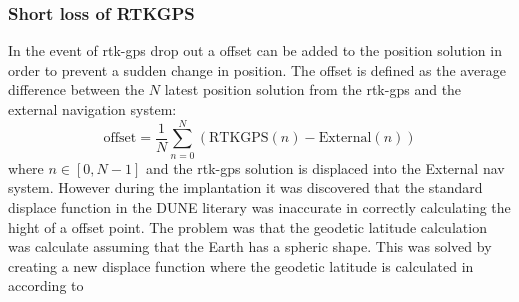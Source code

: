 \subsubsection{Short loss of RTKGPS}\label{ss:ShortLoss}
In the event of \gls{rtk-gps} drop out a offset can be added to the position solution in order to prevent a sudden change in position. The offset is defined as the average difference between the $N$ latest position solution from the \gls{rtk-gps} and the external navigation system:
\begin{equation}
\text{offset} = \frac{1}{N}\sum_{n=0}^N(\text{RTKGPS}(n)-\text{External}(n))
\end{equation}
where $n \in [0,N-1]$ and the \gls{rtk-gps} solution is displaced into the External nav system. However during the implantation it was discovered that the standard displace function in the DUNE literary was inaccurate in correctly calculating the hight of a offset point. The problem was that the geodetic latitude calculation was calculate assuming that the Earth has a spheric shape. This was solved by creating a new displace function where the geodetic latitude is calculated in according to